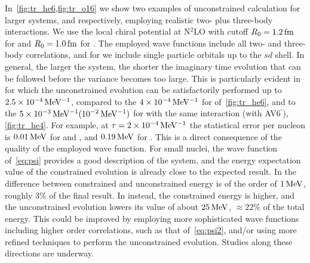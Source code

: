 \documentclass[aps,prc,twocolumn,superscriptaddress,floatfix]{revtex4-1}
\begin{document}
In~\cref{fig:tr_he6,fig:tr_o16} we show two examples of unconstrained calculation for larger systems,
 and  respectively, employing realistic two- plus three-body interactions. 
We use the local chiral potential at N$^2$LO with cutoff $R_0=1.2\,\rm fm$ for 
 and $R_0=1.0\,\rm fm$ for . The employed wave functions include 
all two- and three-body correlations, and for  we include single particle orbitals 
up to the $sd$ shell. In general, the larger the system, the shorter 
the imaginary time evolution that can be followed before the variance becomes too large. 
This is particularly evident in  for which the unconstrained evolution 
can be satisfactorily performed up to $2.5\times10^{-4}\,\rm MeV^{-1}$, 
compared to the $4\times10^{-4}\,\rm MeV^{-1}$
for  of~\cref{fig:tr_he6}, and to the $5\times10^{-3}\,\rm MeV^{-1}(10^{-2}\,\rm MeV^{-1})$ 
for  with the same interaction (with AV6$^\prime$), \cref{fig:tr_he4}.
For example, at $\tau=2\times10^{-4}\,\rm MeV^{-1}$ the statistical error per nucleon is  
$0.01\,\rm MeV$ for  and , and $0.19\,\rm MeV$ for .
This is a direct consequence of the quality of the employed wave function. 
For small nuclei, the wave function of~\cref{eq:psi} provides a good description of the
system, and the energy expectation value of the constrained evolution is already close to the expected result. 
In  the difference between constrained and unconstrained energy is of 
the order of $1\,\rm MeV$, roughly $3\%$ of the final result. 
In  instead, the constrained energy is higher, 
and the unconstrained evolution lowers 
its value of about $25\,\rm MeV$, $\approx22\%$ of the total energy.
This could be improved by employing more sophisticated wave functions including higher order
correlations, such as that of~\cref{eq:psi2}, 
and/or using more refined techniques to perform the unconstrained evolution. 
Studies along these directions are underway.
\end{document}
